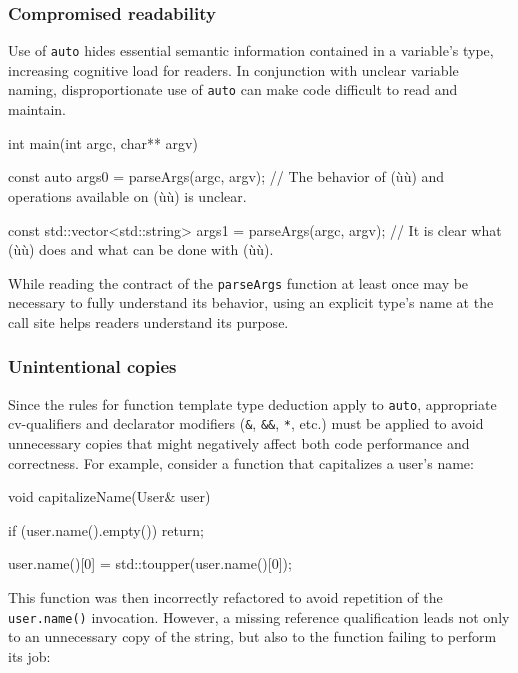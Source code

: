 \subsubsection[Compromised readability]{Compromised readability}\label{compromised-readability}

Use of \lstinline!auto! hides essential semantic information contained in a
variable's type, increasing cognitive load for readers. In conjunction
with unclear variable naming, disproportionate use of \lstinline!auto! can
make code difficult to read and maintain.

\begin{emcppslisting}[language=C++]
int main(int argc, char** argv)
{
    const auto args0 = parseArgs(argc, argv);
        // The behavior of (ù{}ù) and operations available on (ù{}ù) is unclear.

    const std::vector<std::string> args1 = parseArgs(argc, argv);
        // It is clear what (ù{}ù) does and what can be done with (ù{}ù).
}
\end{emcppslisting}
    
\noindent While reading the contract of the \lstinline!parseArgs!
function at least once may be necessary to fully understand its behavior, using an
explicit type's name at the call site helps readers understand its
purpose.

\subsubsection[Unintentional copies]{Unintentional copies}\label{unintentional-copies}

Since the rules for function template type deduction apply to
\lstinline!auto!, appropriate cv-qualifiers and declarator modifiers
(\lstinline!&!, \lstinline!&&!, \lstinline!*!, etc.) must be applied to avoid
unnecessary copies that might negatively affect both code performance
and correctness. For example, consider a function that capitalizes a
user's name:

\begin{emcppslisting}[language=C++]
void capitalizeName(User& user)
{
    if (user.name().empty())
    {
        return;
    }

    user.name()[0] = std::toupper(user.name()[0]);
}
\end{emcppslisting}
    
\noindent This function was then incorrectly refactored to avoid repetition of
the \lstinline!user.name()! invocation. However, a missing reference
qualification leads not only to an unnecessary copy of the string, but
also to the function failing to perform its job:

